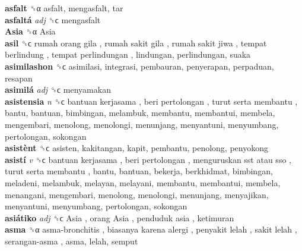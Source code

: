 \textbf{asfalt} ␝α  asfalt, mengasfalt, tar  \\
\textbf{asfaltá} \emph{adj}  ␝ϲ  mengasfalt  \\
\textbf{Asia} ␝α   Asia   \\
\textbf{asil} ␝ϲ   rumah orang gila ,  rumah sakit gila ,  rumah sakit jiwa ,  tempat berlindung ,  tempat perlindungan , lindungan, perlindungan, suaka  \\
\textbf{asimilashon} ␝ϲ  asimilasi, integrasi, pembauran, penyerapan, perpaduan, resapan  \\
\textbf{asimilá} \emph{adj}  ␝ϲ  menyamakan  \\
\textbf{asistensia} \emph{n}  ␝ϲ   bantuan kerjasama ,  beri pertolongan ,  turut serta membantu , bantu, bantuan, bimbingan, melambuk, membantu, membantui, membela, mengembari, menolong, menolongi, menunjang, menyantuni, menyumbang, pertolongan, sokongan  \\
\textbf{asistènt} ␝ϲ  asisten, kakitangan, kapit, pembantu, penolong, penyokong  \\
\textbf{asistí} \emph{v}  ␝ϲ   bantuan kerjasama ,  beri pertolongan ,  menguruskan sst atau sso ,  turut serta membantu , bantu, bantuan, bekerja, berkhidmat, bimbingan, meladeni, melambuk, melayan, melayani, membantu, membantui, membela, menangani, mengembari, menolong, menolongi, menunjang, menyajikan, menyantuni, menyumbang, pertolongan, sokongan  \\
\textbf{asiátiko} \emph{adj}  ␝ϲ   Asia ,  orang Asia ,  penduduk asia , ketimuran  \\
\textbf{asma} ␝α   asma-bronchitis ,  biasanya karena alergi ,  penyakit lelah ,  sakit lelah ,  serangan-asma , asma, lelah, semput  \\
